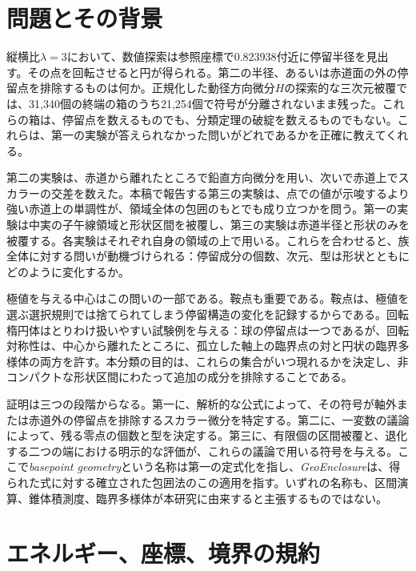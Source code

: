 \section{問題とその背景}\label{sec:introduction}

縦横比$\lambda=3$において、数値探索は参照座標で$0.823938$付近に停留半径を見出す。その点を回転させると円が得られる。第二の半径、あるいは赤道面の外の停留点を排除するものは何か。正規化した動径方向微分$H$の探索的な三次元被覆では、31,340個の終端の箱のうち21,254個で符号が分離されないまま残った。これらの箱は、停留点を数えるものでも、分類定理の破綻を数えるものでもない。これらは、第一の実験が答えられなかった問いがどれであるかを正確に教えてくれる。

第二の実験は、赤道から離れたところで鉛直方向微分を用い、次いで赤道上でスカラーの交差を数えた。本稿で報告する第三の実験は、点での値が示唆するより強い赤道上の単調性が、領域全体の包囲のもとでも成り立つかを問う。第一の実験は中実の子午線領域と形状区間を被覆し、第三の実験は赤道半径と形状のみを被覆する。各実験はそれぞれ自身の領域の上で用いる。これらを合わせると、族全体に対する問いが動機づけられる：停留成分の個数、次元、型は形状とともにどのように変化するか。

極値を与える中心はこの問いの一部である。鞍点も重要である。鞍点は、極値を選ぶ選択規則では捨てられてしまう停留構造の変化を記録するからである。回転楕円体はとりわけ扱いやすい試験例を与える：球の停留点は一つであるが、回転対称性は、中心から離れたところに、孤立した軸上の臨界点の対と円状の臨界多様体の両方を許す。本分類の目的は、これらの集合がいつ現れるかを決定し、非コンパクトな形状区間にわたって追加の成分を排除することである。



証明は三つの段階からなる。第一に、解析的な公式によって、その符号が軸外または赤道外の停留点を排除するスカラー微分を特定する。第二に、一変数の議論によって、残る零点の個数と型を決定する。第三に、有限個の区間被覆と、退化する二つの端における明示的な評価が、これらの議論で用いる符号を与える。ここで\emph{basepoint geometry}という名称は第一の定式化を指し、\emph{GeoEnclosure}は、得られた式に対する確立された包囲法のこの適用を指す\citep{furutaGeoEnclosure2026}。いずれの名称も、区間演算、錐体積測度、臨界多様体が本研究に由来すると主張するものではない。

\section{エネルギー、座標、境界の規約}\label{sec:definition}

